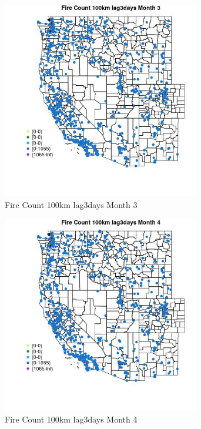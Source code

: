 \begin{figure} 
\centering  
\includegraphics[width=0.77\textwidth]{Code_Outputs/Report_ML_input_PM25_Step4_part_f_de_duplicated_aves_prioritize_24hr_obswNAs_MapObsMo3Fire_Count_100km_lag3days.jpg} 
\caption{\label{fig:Report_ML_input_PM25_Step4_part_f_de_duplicated_aves_prioritize_24hr_obswNAsMapObsMo3Fire_Count_100km_lag3days}Fire Count 100km lag3days Month 3} 
\end{figure} 
 

\begin{figure} 
\centering  
\includegraphics[width=0.77\textwidth]{Code_Outputs/Report_ML_input_PM25_Step4_part_f_de_duplicated_aves_prioritize_24hr_obswNAs_MapObsMo4Fire_Count_100km_lag3days.jpg} 
\caption{\label{fig:Report_ML_input_PM25_Step4_part_f_de_duplicated_aves_prioritize_24hr_obswNAsMapObsMo4Fire_Count_100km_lag3days}Fire Count 100km lag3days Month 4} 
\end{figure} 
 

